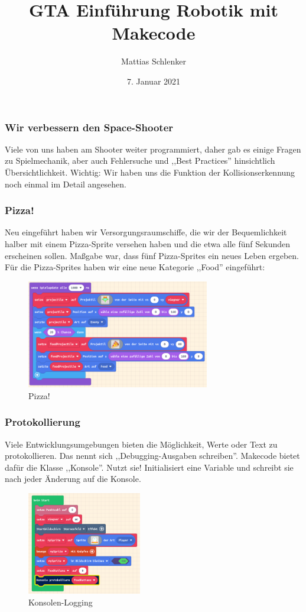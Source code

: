 \documentclass{beamer}
\title{GTA Einführung Robotik mit Makecode}
\author{Mattias Schlenker}
\institute{Wilhelm-Ostwald-Gymnasium}
\date{7. Januar 2021}
\begin{document}
\frame{\titlepage}

\begin{frame}
\frametitle{Wir verbessern den Space-Shooter}

Viele von uns haben am Shooter weiter programmiert, daher gab es einige Fragen zu Spielmechanik, aber auch Fehlersuche und ,,Best Practices'' hinsichtlich Übersichtlichkeit. Wichtig: Wir haben uns die Funktion der Kollisionserkennung noch einmal im Detail angesehen.
 
\end{frame}
 
 \begin{frame}
 \frametitle{Pizza!}
 
Neu eingeführt haben wir Versorgungsraumschiffe, die wir der Bequemlichkeit halber mit einem Pizza-Sprite versehen haben und die etwa alle fünf Sekunden erscheinen sollen. Maßgabe war, dass fünf Pizza-Sprites ein neues Leben ergeben. Für die Pizza-Sprites haben wir eine neue Kategorie ,,Food'' eingeführt:
 
 \begin{figure}
  \includegraphics[width=8cm]{game15.png}
  \caption{Pizza!}
  \label{fig:game15}
\end{figure}

\end{frame}

 \begin{frame}
 \frametitle{Protokollierung}
 
Viele Entwicklungsumgebungen bieten die Möglichkeit, Werte oder Text zu protokollieren. Das nennt sich ,,Debugging-Ausgaben schreiben''. Makecode bietet dafür die Klasse ,,Konsole''. Nutzt sie! Initialisiert eine Variable und schreibt sie nach jeder Änderung auf die Konsole.  
 
 \begin{figure}
  \includegraphics[width=5cm]{game16.png}
  \caption{Konsolen-Logging}
  \label{fig:game16}
\end{figure}

\end{frame}
\end{document}
